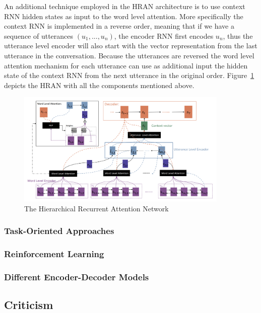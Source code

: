 \documentclass[12pt]{article}
\begin{document}
An additional technique employed in the HRAN architecture is to use context RNN hidden states as input to the word level attention. More specifically the context RNN is implemented in a reverse order, meaning that if we have a sequence of utterances \((u_1,...,u_n)\), the encoder RNN first encodes \(u_n\), thus the utterance level encoder will also start with the vector representation from the last utterance in the conversation. Because the utterances are reversed the word level attention mechanism for each utterance can use as additional input the hidden state of the context RNN from the next utterance in the original order. Figure~\ref{fig:HRAN} depicts the HRAN with all the components mentioned above.
\begin{figure}[H]
	\label{fig:HRAN}
	\centering
	\includegraphics[width=0.9\textwidth]{pics/hran.png}
	\caption{The Hierarchical Recurrent Attention Network \cite{Xing:2017}}
\end{figure}




\subsubsection{Task-Oriented Approaches} \label{sssec:task}
\subsubsection{Reinforcement Learning} \label{sssec:RL}

\subsubsection{Different Encoder-Decoder Models} \label{sssec:diffencdec}

\subsection{Criticism} \label{ssec:problems}
\end{document}
